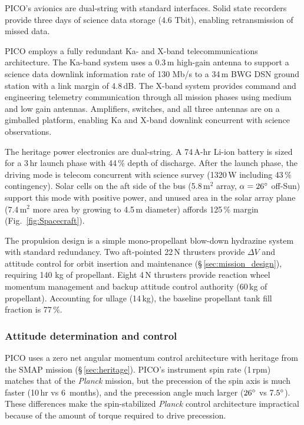 PICO's avionics are dual-string with standard interfaces. Solid state
recorders provide three days of science data storage (4.6 Tbit), enabling
retransmission of missed data.

PICO employs a fully redundant Ka- and X-band telecommunications
architecture. The Ka-band system uses a 0.3\,m high-gain antenna to
support a science data downlink information rate of 130 Mb/s to a
34\,m BWG DSN ground station with a link margin of 4.8\,dB. The X-band
system provides command and engineering telemetry communication
through all mission phases using medium and low gain
antennas. Amplifiers, switches, and all three antennas are on a
gimballed platform, enabling Ka and X-band downlink concurrent with
science observations.

 The heritage power electronics are dual-string.
A 74\,A-hr Li-ion battery is sized for a 3\,hr launch phase with 44\,\% depth of discharge. 
After the launch phase, the driving
mode is telecom concurrent with science survey (1320\,W including 43\,\% contingency). 
Solar cells on the aft side of the bus (5.8\,m$^2$ array, $\alpha=26^\circ$ off-Sun) support this mode with positive power,  and unused area in the solar array plane (7.4\,m$^2$ more area by growing to 4.5\,m diameter) affords 125\,\% margin
(Fig.~\ref{fig:Spacecraft}).

The propulsion design is a simple mono-propellant blow-down hydrazine
system with standard redundancy. Two aft-pointed 22\,N thrusters
provide $\Delta V$ and attitude control for orbit insertion and
maintenance (\S\,\ref{sec:mission_design}), requiring 140 kg of
propellant.  Eight 4\,N thrusters provide reaction wheel momentum
management and backup attitude control authority (60\,kg of
propellant). Accounting for ullage (14\,kg), the baseline propellant
tank fill fraction is 77\,\%.


\subsubsection{Attitude determination and control}
\label{sec:attitude_determination} %

PICO uses a zero net angular momentum control architecture with
heritage from the SMAP mission (\S\,\ref{sec:heritage}). PICO's instrument
spin rate (1\,rpm) matches that of the \textit{Planck} mission, but
the precession of the spin axis is much faster (10\,hr vs 6\, months),
and the precession angle much larger ($26^\circ$ vs
$7.5^\circ$). These differences make the spin-stabilized
\textit{Planck} control architecture impractical because of the amount
of torque required to drive precession.

